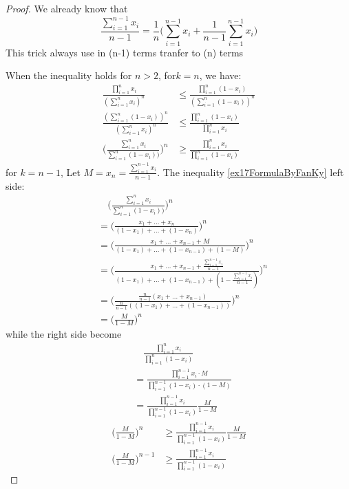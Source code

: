 \begin{example}
\begin{proof}
We already know that
\begin{equation*}
	\frac{\sum_{i=1}^{n-1} x_i}{n-1} = \frac{1}{n}\Big(\sum_{i=1}^{n-1}x_i+\frac{1}{n-1}\sum_{i=1}^{n-1}x_i\Big)
\end{equation*}
This trick always use in (n-1) terms tranfer to (n) terms

 When the inequality holds for $ n>2 $, for$ k=n $, we have:
\begin{align*}
	\frac{\prod_{i=1}^n x_i}{(\sum_{i=1}^n x_i)^n} &\leqslant \frac{\prod_{i=1}^n(1-x_i)}{(\sum_{i=1}^n(1-x_i))^n}\\
	\frac{(\sum_{i=1}^n(1-x_i))^n}{(\sum_{i=1}^n x_i)^n} &\leqslant \frac{\prod_{i=1}^n(1-x_i)}{\prod_{i=1}^n x_i}\\	
	\Bigg(\frac{\sum_{i=1}^n x_i}{\sum_{i=1}^n (1-x_i))}\Bigg)^n &\ge
	 \frac{\prod_{i=1}^n x_i}{\prod_{i=1}^n (1-x_i)}
\end{align*}
for $ k=n-1 $, Let $ M = x_n = \frac{\sum_{i=1}^{n-1} x_i}{n-1} $. The inequality \ref{ex17FormulaByFanKy} left side: 
\begin{align*}
	&\quad\Bigg(\frac{\sum_{i=1}^n x_i}{\sum_{i=1}^n (1-x_i))}\Bigg)^n \\
	&=\Bigg(\frac{x_1+\dots+x_n}{(1-x_1)+\dots+(1-x_n)}\Bigg)^n\\
	&=\Bigg(\frac{x_1+\dots+x_{n-1} + M}{(1-x_1)+\dots+(1-x_{n-1}) + (1-M)}\Bigg)^n\\
	&=\Bigg(\frac{x_1+\dots+x_{n-1} + \frac{\sum_{i=1}^{n-1} x_i}{n-1}}{(1-x_1)+\dots+(1-x_{n-1}) + (1-\frac{\sum_{i=1}^{n-1} x_i}{n-1})}\Bigg)^n\\
	&=\Bigg(\frac{\frac{n}{n-1}(x_1+\dots+x_{n-1})}{\frac{n}{n-1}((1-x_1)+\dots+(1-x_{n-1}))}\Bigg)^n\\
	&=\Bigg(\frac{M}{1-M}\Bigg)^n	
\end{align*}
while the right side become
\begin{align*}
	&\quad\frac{\prod_{i=1}^n x_i}{\prod_{i=1}^n (1-x_i)}\\
	&=\frac{\prod_{i=1}^{n-1} x_i \cdot M}{\prod_{i=1}^{n-1} (1-x_i)\cdot(1-M)}\\
	&=\frac{\prod_{i=1}^{n-1} x_i}{\prod_{i=1}^{n-1} (1-x_i)}\frac{M}{1-M}
\end{align*}
\begin{align*}
	\Bigg(\frac{M}{1-M}\Bigg)^n &\ge \frac{\prod_{i=1}^{n-1} x_i}{\prod_{i=1}^{n-1} (1-x_i)}\frac{M}{1-M}\\
	\Bigg(\frac{M}{1-M}\Bigg)^{n-1} &\ge \frac{\prod_{i=1}^{n-1} x_i}{\prod_{i=1}^{n-1} (1-x_i)}
\end{align*}
\end{proof}
\end{example}
